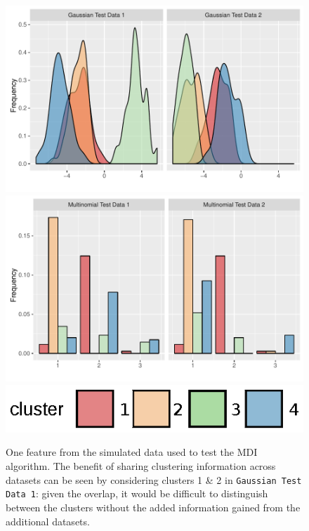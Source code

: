 \documentclass[10pt,a4paper]{article}
\begin{document}
\begin{center}
\begin{figure}
\includegraphics{Plots/gauss_density.pdf}
\includegraphics{Plots/multinom_bar.pdf}
\includegraphics{Plots/legend.eps}

\caption{One feature from the simulated data used to test the MDI algorithm. The benefit of sharing clustering information across datasets can be seen by considering clusters 1 \& 2 in \texttt{Gaussian Test Data 1}: given the overlap, it would be difficult to distinguish between the clusters without the added information gained from the additional datasets.}
\label{fig:data}
\end{figure}
\end{center}
\end{document}
